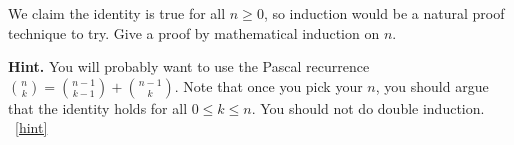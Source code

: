\documentclass{book}
\begin{document}
\setcounter{project}{73}
\addtocounter{project}{-1}
\begin{activity}[]\label{activity-66}
\hypertarget{p-583}{}%
We claim the identity is true for all \(n \ge 0\), so induction would be a natural proof technique to try.  Give a proof by mathematical induction on \(n\).%
\par\smallskip%
\noindent\textbf{Hint.}\hypertarget{hint-28}{}\quad%
\hypertarget{p-584}{}%
You will probably want to use the Pascal recurrence \(\binom{n}{k} = \binom{n-1}{k-1} + \binom{n-1}{k}\).  Note that once you pick your \(n\), you should argue that the identity holds for all \(0 \le k \le n\).  You should not do double induction.%
~\hfill{\tiny\hyperlink{a-73}{[hint]}\hypertarget{q-73}{}}\end{activity}
\end{document}
